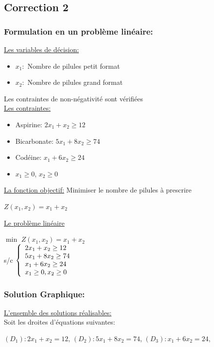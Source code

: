 \documentclass[]{book}
\begin{document}
\subsection*{Correction 2}
\subsubsection{Formulation en un problème linéaire:}
\underline{Les variables de décision:}
\begin{itemize}
    \item $x_1:$ Nombre de pilules petit format
    \item $x_2:$ Nombre de pilules grand format
\end{itemize}
Les contraintes de non-négativité sont vérifiées\\
\underline{Les contraintes:}
\begin{itemize}
    \item Aspirine: $2x_1+x_2 \geq 12$
    \item Bicarbonate: $5x_1 + 8x_2 \geq 74$
    \item Codéine: $x_1 + 6x_2 \geq 24$
    \item $x_1 \geq 0$, $x_2 \geq 0$
\end{itemize}
\underline{La fonction objectif:}
Minimiser le nombre de pilules à prescrire\\
\begin{center}
    $Z(x_1,x_2) = x_1 + x_2$
\end{center}
\underline{Le problème linéaire}
\begin{center}
    $\min$ $Z(x_1,x_2) = x_1 + x_2$\\
s/c $\left\{
	\begin{array}l
	2x_1 + x_2 \geq 12\\
    5x_1 + 8 x_2 \geq 74\\
    x_1 + 6x_2 \geq 24\\
    x_1 \geq 0, x_2 \geq 0\end{array}
	\right.$
\end{center} 

\subsubsection{Solution Graphique:}
\underline{L'ensemble des solutions réalisables:}\\
Soit les droites d'équations suivantes:
\begin{center}
    $(D_1): 2x_1 + x_2 = 12$, $(D_2): 5x_1 + 8 x_2 = 74$, $(D_3): x_1 + 6x_2 = 24$, 
\end{center}
\end{document}
